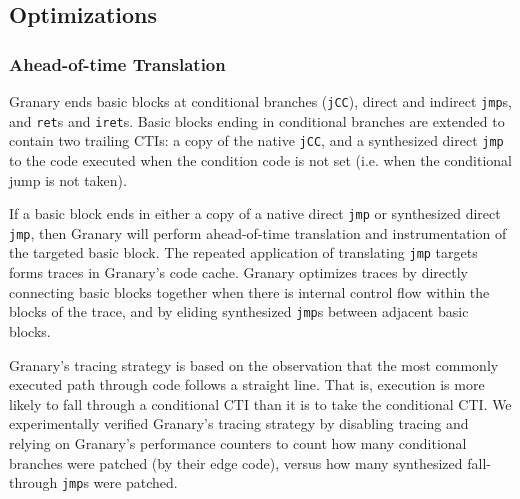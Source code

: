 \documentclass[preprint]{sigplanconf}
\begin{document}

\subsection{Optimizations}

\subsubsection{Ahead-of-time Translation} \label{sec:aot}
Granary ends basic blocks at conditional branches (\texttt{jCC}), direct and indirect \texttt{jmp}s, and \texttt{ret}s and \texttt{iret}s. Basic blocks ending in conditional branches are extended to contain two trailing CTIs: a copy of the native \texttt{jCC}, and a synthesized direct \texttt{jmp} to the code executed when the condition code is not set (i.e. when the conditional jump is not taken).

If a basic block ends in either a copy of a native direct \texttt{jmp} or synthesized direct \texttt{jmp}, then Granary will perform ahead-of-time translation and instrumentation of the targeted basic block. The repeated application of translating \texttt{jmp} targets forms traces in Granary's code cache. Granary optimizes traces by directly connecting basic blocks together when there is internal control flow within the blocks of the trace, and by eliding synthesized \texttt{jmp}s between adjacent basic blocks.

Granary's tracing strategy is based on the observation that the most commonly executed path through code follows a straight line. That is, execution is more likely to fall through a conditional CTI than it is to take the conditional CTI. We experimentally verified Granary's tracing strategy by disabling tracing and relying on Granary's performance counters to count how many conditional branches were patched (by their edge code), versus how many synthesized fall-through \texttt{jmp}s were patched.

\end{document}
